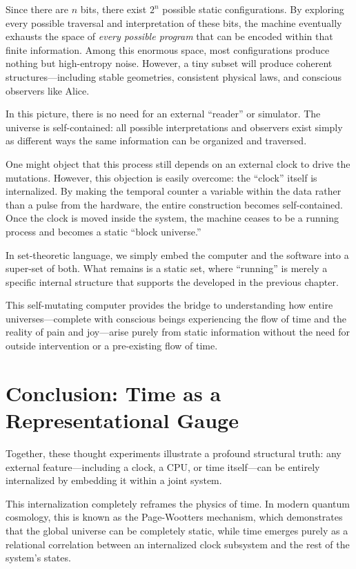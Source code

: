 Since there are $n$ bits, there exist $2^n$ possible static configurations. 
By exploring every possible traversal and interpretation of these bits, the machine eventually exhausts the space of \emph{every possible program} that can be encoded within that finite information. 
Among this enormous space, most configurations produce nothing but high-entropy noise. 
However, a tiny subset will produce coherent structures---including stable geometries, consistent physical laws, and conscious observers like Alice.

In this picture, there is no need for an external ``reader'' or simulator. 
The universe is self-contained: all possible interpretations and observers exist simply as different ways the same information can be organized and traversed.

One might object that this process still depends on an external clock to drive the mutations. 
However, this objection is easily overcome: the ``clock'' itself is internalized. 
By making the temporal counter a variable within the data rather than a pulse from the hardware, the entire construction becomes self-contained. 
Once the clock is moved inside the system, the machine ceases to be a running process and becomes a static ``block universe.''

In set-theoretic language, we simply embed the computer and the software into a super-set of both. 
What remains is a static set, where ``running'' is merely a specific internal structure that supports the  developed in the previous chapter. 

This self-mutating computer provides the bridge to understanding how entire universes---complete with conscious beings experiencing the flow of time and the reality of pain and joy---arise purely from static information without the need for outside intervention or a pre-existing flow of time.


\section{Conclusion: Time as a Representational Gauge}

Together, these thought experiments illustrate a profound structural truth: any external feature—including a clock, a CPU, or time itself—can be entirely internalized by embedding it within a joint system.

This internalization completely reframes the physics of time.
In modern quantum cosmology, this is known as the Page-Wootters \cite{page1983clock} mechanism, which demonstrates that the global universe can be completely static, while time emerges purely as a relational correlation between an internalized clock subsystem and the rest of the system's states. 


